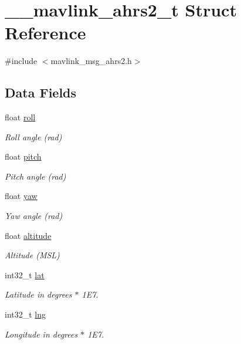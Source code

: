 \hypertarget{struct____mavlink__ahrs2__t}{\section{\+\_\+\+\_\+mavlink\+\_\+ahrs2\+\_\+t Struct Reference}
\label{struct____mavlink__ahrs2__t}
}


{\ttfamily \#include $<$mavlink\+\_\+msg\+\_\+ahrs2.\+h$>$}

\subsection*{Data Fields}
\begin{DoxyCompactItemize}
\item 
float \hyperlink{struct____mavlink__ahrs2__t_a5e6a3ab1e22639486bf1698b0cfb41df}{roll}
\begin{DoxyCompactList}\small\item\em Roll angle (rad) \end{DoxyCompactList}\item 
float \hyperlink{struct____mavlink__ahrs2__t_a55cddc3c2958e03cfb510b85c7b2e47c}{pitch}
\begin{DoxyCompactList}\small\item\em Pitch angle (rad) \end{DoxyCompactList}\item 
float \hyperlink{struct____mavlink__ahrs2__t_a1bd91fd81102fd424808db6ef4e8aa66}{yaw}
\begin{DoxyCompactList}\small\item\em Yaw angle (rad) \end{DoxyCompactList}\item 
float \hyperlink{struct____mavlink__ahrs2__t_a629a5e1401ac649da94088a0ce6b82fc}{altitude}
\begin{DoxyCompactList}\small\item\em Altitude (M\+S\+L) \end{DoxyCompactList}\item 
int32\+\_\+t \hyperlink{struct____mavlink__ahrs2__t_a5784fe6c6f8459fc3f8000f5a0ac2a4d}{lat}
\begin{DoxyCompactList}\small\item\em Latitude in degrees $\ast$ 1\+E7. \end{DoxyCompactList}\item 
int32\+\_\+t \hyperlink{struct____mavlink__ahrs2__t_ad72c104f2a5def605811023bc056ce55}{lng}
\begin{DoxyCompactList}\small\item\em Longitude in degrees $\ast$ 1\+E7. \end{DoxyCompactList}\end{DoxyCompactItemize}


